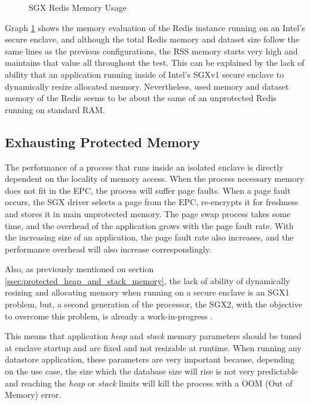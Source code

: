 \begin{figure}[htbp]
  \caption{SGX Redis Memory Usage}
  \label{fig:redis_sgx_memory}
\end{figure}

Graph \ref{fig:redis_sgx_memory} shows the memory evaluation of the Redis instance running on an Intel's secure enclave, and although the total Redis memory and dataset size follow the same lines as the previous configurations, the \gls{RSS} memory starts very high and maintains that value all throughout the test. This can be explained by the lack of ability that an application running inside of Intel's \gls{SGX}v1 secure enclave to dynamically resize allocated memory. Nevertheless, used memory and dataset memory of the Redis seems to be about the same of an unprotected Redis running on standard \gls{RAM}.

\subsection{Exhausting Protected Memory}
\label{ssec:exhausting_protected_memory}

The performance of a process that runs inside an isolated enclave is directly dependent on the locality of memory access. When the process necessary memory does not fit in the \gls{EPC}, the process will suffer page faults. When a page fault occurs, the \gls{SGX} driver selects a page from the \gls{EPC}, re-encrypts it for freshness and stores it in main unprotected memory. The page swap process takes some time, and the overhead of the application grows with the page fault rate. With the increasing size of an application, the page fault rate also increases, and the performance overhead will also increase correspondingly.  

Also, as previously mentioned on section \ref{ssec:protected_heap_and_stack_memory}, the lack of ability of dynamically resizing and allocating memory when running on a secure enclave is an \gls{SGX}1 problem, but, a second generation of the processor, the \gls{SGX}2, with the objective to overcome this problem, is already a work-in-progress \cite{Xing2016}.

This means that application \textit{heap} and \textit{stack} memory parameters should be tuned at enclave startup and are fixed and not resizable at runtime. When running any datastore application, these parameters are very important because, depending on the use case, the size which the database size will rise is not very predictable and reaching the \textit{heap} or \textit{stack} limits will kill the process with a \gls{OOM} (Out of Memory) error.

